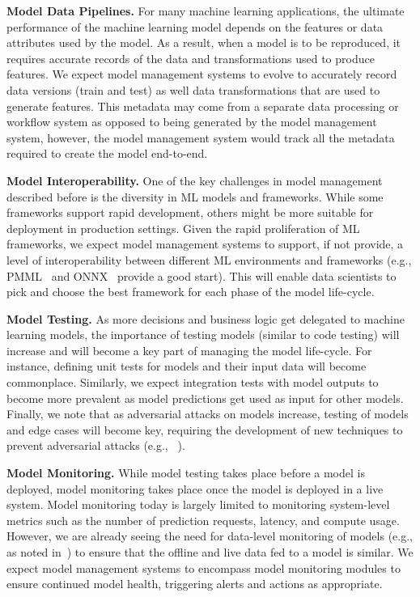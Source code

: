 \documentclass[11pt]{article}
\newcommand{\dss}{data scientists\xspace}
\begin{document}
{\bf Model Data Pipelines.} For many machine learning applications, the ultimate performance of the machine learning model depends on the features or data attributes used by the model.
As a result, when a model is to be reproduced, it requires accurate records of the data and transformations used to produce features.
We expect model management systems to evolve to accurately record data versions (train and test) as well data transformations that are used to generate features.
This metadata may come from a separate data processing or workflow system as opposed to being generated by the model management system, however, the model management system would track all the metadata required to create the model end-to-end.

{\bf Model Interoperability.} One of the key challenges in model management described before is the diversity in ML models and frameworks.
While some frameworks support rapid development, others might be more suitable for deployment in production settings.
Given the rapid proliferation of ML frameworks, we expect model management systems to support, if not provide, a level of interoperability between different ML environments and frameworks (e.g., PMML~\cite{pmml} and ONNX~\cite{onnx} provide a good start).
This will enable \dss to pick and choose the best framework for each phase of the model life-cycle.

{\bf Model Testing.} As more decisions and business logic get delegated to machine learning models, the importance of testing models (similar to code testing) will increase and will become a key part of managing the model life-cycle.
For instance, defining unit tests for models and their input data will become commonplace.
Similarly, we expect integration tests with model outputs to become more prevalent as model predictions get used as input for other models.
Finally, we note that as adversarial attacks on models increase, testing of models and edge cases will become key, requiring the development of new techniques to prevent adversarial attacks (e.g., ~\cite{adversarialICLR2015
,feinman2017detectAdversarial}). 

{\bf Model Monitoring.} While model testing takes place before a model is deployed, model monitoring takes place once the model is deployed in a live system.
Model monitoring today is largely limited to monitoring system-level metrics such as the number of prediction requests, latency, and compute usage.
However, we are already seeing the need for data-level monitoring of models (e.g., as noted in~\cite{sculley2014high-interest-cc}) to ensure that the offline and live data fed to a model is similar.
We expect model management systems to encompass model monitoring modules to ensure continued model health, triggering alerts and actions as appropriate.
\end{document}
